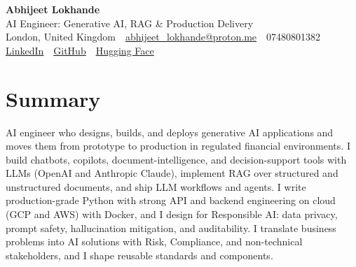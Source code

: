 \documentclass[10pt,a4paper]{article}
\newcommand{\sep}{\,\textcolor{accent!60}{\textbar}\,}
\begin{document}
\begin{center}
  {\fontsize{24}{26}\selectfont\bfseries Abhijeet Lokhande}\\[3pt]
  {\color{accent}\large AI Engineer: Generative AI, RAG \& Production Delivery}\\[5pt]
  {\small
    London, United Kingdom \sep
    \href{mailto:abhijeet_lokhande@proton.me}{abhijeet\_lokhande@proton.me} \sep
    07480801382 \\[2pt]
    \href{https://www.linkedin.com/in/ablds/}{LinkedIn} \sep
    \href{https://github.com/abhijeetscode}{GitHub} \sep
    \href{https://huggingface.co/ab-ai}{Hugging Face}
  }
\end{center}
\vspace{2pt}

\section{Summary}
AI engineer who designs, builds, and deploys generative AI applications and moves them from prototype to production in regulated financial environments. I build chatbots, copilots, document-intelligence, and decision-support tools with LLMs (OpenAI and Anthropic Claude), implement RAG over structured and unstructured documents, and ship LLM workflows and agents. I write production-grade Python with strong API and backend engineering on cloud (GCP and AWS) with Docker, and I design for Responsible AI: data privacy, prompt safety, hallucination mitigation, and auditability. I translate business problems into AI solutions with Risk, Compliance, and non-technical stakeholders, and I shape reusable standards and components.

\end{document}
